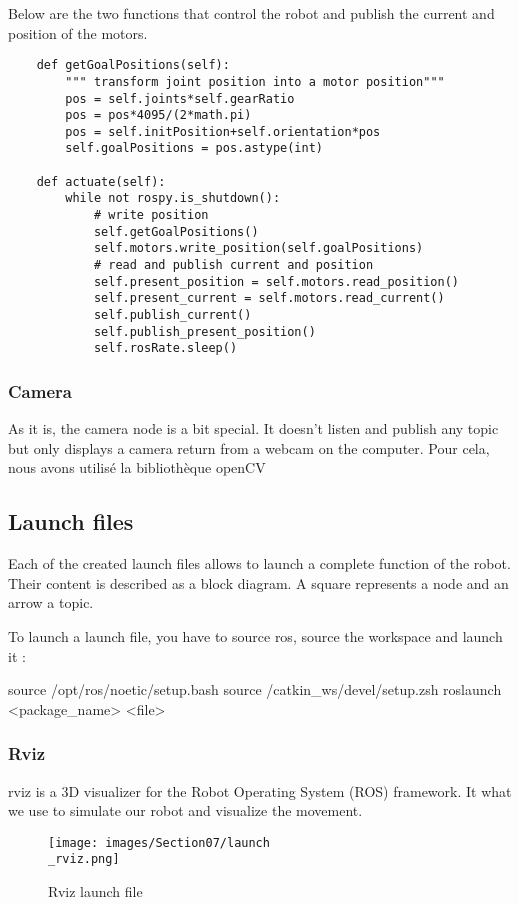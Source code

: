 \bigbreak
Below are the two functions that control the robot and publish the current and position of the motors.
\begin{verbatim}
    def getGoalPositions(self):
        """ transform joint position into a motor position"""
        pos = self.joints*self.gearRatio
        pos = pos*4095/(2*math.pi)
        pos = self.initPosition+self.orientation*pos
        self.goalPositions = pos.astype(int)
        
    def actuate(self):
        while not rospy.is_shutdown():
            # write position
            self.getGoalPositions()
            self.motors.write_position(self.goalPositions)
            # read and publish current and position
            self.present_position = self.motors.read_position()
            self.present_current = self.motors.read_current()
            self.publish_current()
            self.publish_present_position()
            self.rosRate.sleep()
\end{verbatim}

\subsubsection{Camera}
As it is, the camera node is a bit special. It doesn't listen and publish any topic but only displays a camera return from a webcam on the computer. Pour cela, nous avons utilisé la bibliothèque openCV

\subsection{Launch files}

Each of the created launch files allows to launch a complete function of the robot. Their content is described as a block diagram. A square represents a node and an arrow a topic. 

\bigbreak
To launch a launch file, you have to source ros, source the workspace and launch it :
\begin{commandshell}
    source /opt/ros/noetic/setup.bash
    source /catkin_ws/devel/setup.zsh
    roslaunch <package_name> <file>
\end{commandshell} 

\subsubsection{Rviz}

rviz is a 3D visualizer for the Robot Operating System (ROS) framework. It what we use to simulate our robot and visualize the movement.
\bigbreak
\begin{figure}[ht]
    \centering
    \texttt{[image: images/Section07/launch\\\_rviz.png]}
    \caption{Rviz launch file}
    \label{fig:mesh21}
\end{figure}
\FloatBarrier

